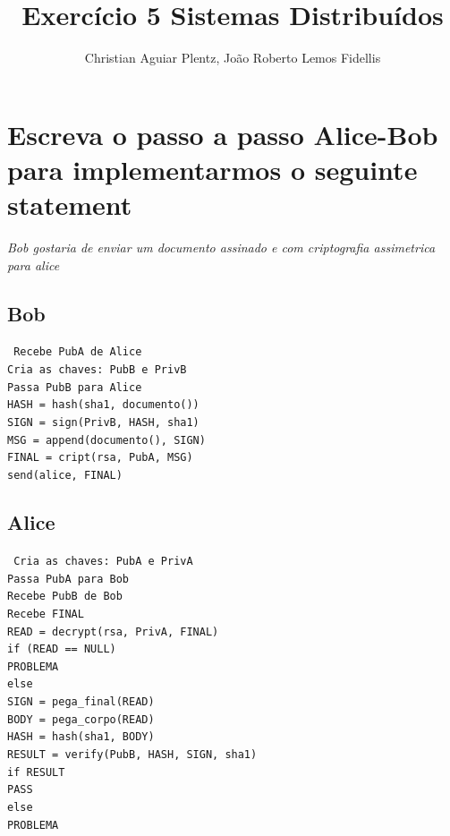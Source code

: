 \documentclass[12pt]{article}
\title{Exercício 5 Sistemas Distribuídos}
\author{Christian Aguiar Plentz\inst{1}, João Roberto Lemos Fidellis\inst{2} }
\begin{document}
 

\maketitle

 \section{Escreva o passo a passo Alice-Bob para implementarmos o seguinte statement}
	\textit{Bob gostaria de enviar um documento assinado e com criptografia assimetrica para alice}

\subsection{Bob}

\texttt{
\noindent Recebe PubA de Alice \\
Cria as chaves: PubB e PrivB \\
Passa PubB para Alice \\
HASH = hash(sha1, documento()) \\
SIGN = sign(PrivB, HASH, sha1) \\
MSG = append(documento(), SIGN) \\
FINAL = cript(rsa, PubA, MSG) \\
send(alice, FINAL) \\
}

\subsection{Alice}
\texttt{
\noindent Cria as chaves: PubA e PrivA \\
Passa PubA para Bob \\
Recebe PubB de Bob \\
Recebe FINAL \\
READ = decrypt(rsa, PrivA, FINAL) \\
if (READ == NULL) \\
\indent PROBLEMA \\
else \\
\indent SIGN = pega\_final(READ) \\
\indent BODY = pega\_corpo(READ) \\
\indent HASH = hash(sha1, BODY) \\
\indent RESULT = verify(PubB, HASH, SIGN, sha1) \\
\indent if RESULT \\
\indent \indent PASS \\
\indent else \\
\indent	\indent PROBLEMA \\
}
\end{document}
